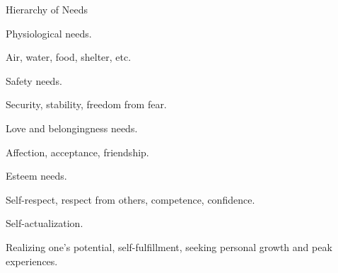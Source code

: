 \begin{coloredlist}
    \item Hierarchy of Needs
    \begin{coloredlist}
        \item Physiological needs.
        \begin{coloredlist}
            \item Air, water, food, shelter, etc.
        \end{coloredlist}
        \item Safety needs.
        \begin{coloredlist}
            \item Security, stability, freedom from fear.
        \end{coloredlist}
        \item Love and belongingness needs.
        \begin{coloredlist}
            \item Affection, acceptance, friendship.
        \end{coloredlist}
        \item Esteem needs.
        \begin{coloredlist}
            \item Self-respect, respect from others, competence, confidence.
        \end{coloredlist}
        \item Self-actualization.
        \begin{coloredlist}
            \item Realizing one's potential, self-fulfillment, seeking personal growth and peak experiences.
        \end{coloredlist}
    \end{coloredlist}
\end{coloredlist}
